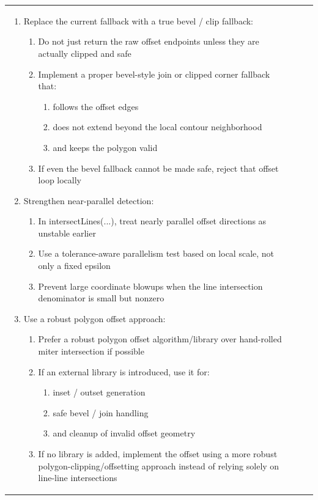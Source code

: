 \documentclass[10pt,twocolumn,a4paper]{article}
\begin{document}
\begin{longtable}{@{}p{0.6cm}p{1.5cm}p{11.0cm}p{2.7cm}@{}}
\begin{enumerate}
	\item{Replace the current fallback with a true bevel / clip fallback:}
	\begin{enumerate}
		\item{Do not just return the raw offset endpoints unless they are actually clipped and safe}
		\item{Implement a proper bevel-style join or clipped corner fallback that:}
		\begin{enumerate}
			\item{follows the offset edges}
			\item{does not extend beyond the local contour neighborhood}
			\item{and keeps the polygon valid} 
		\end{enumerate}
		\item{If even the bevel fallback cannot be made safe, reject that offset loop locally} 
	\end{enumerate}
	\item{Strengthen near-parallel detection:}
	\begin{enumerate}
		\item{In intersectLines(...), treat nearly parallel offset directions as unstable earlier}
		\item{Use a tolerance-aware parallelism test based on local scale, not only a fixed epsilon}
		\item{Prevent large coordinate blowups when the line intersection denominator is small but nonzero} 
	\end{enumerate}
	\item{Use a robust polygon offset approach:}
	\begin{enumerate}
		\item{Prefer a robust polygon offset algorithm/library over hand-rolled miter intersection if possible}
		\item{If an external library is introduced, use it for:}
		\begin{enumerate}
			\item{inset / outset generation}
			\item{safe bevel / join handling}
			\item{and cleanup of invalid offset geometry} 
		\end{enumerate}
		\item{If no library is added, implement the offset using a more robust polygon-clipping/offsetting approach instead of relying solely on line-line intersections} 
	\end{enumerate}

\end{enumerate}
\end{longtable}
\end{document}
